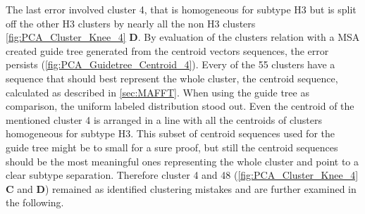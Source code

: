 The last error involved cluster 4, that is homogeneous for subtype H3 but is split off the other H3 clusters by nearly all the non H3 clusters \autoref{fig:PCA_Cluster_Knee_4} \textbf{\textsf{D}}. By evaluation of the clusters relation with a \gls{MSA} created guide tree generated from the centroid vectors sequences, the error persists (\autoref{fig:PCA_Guidetree_Centroid_4}). Every of the 55 clusters have a sequence that should best represent the whole cluster, the centroid sequence, calculated as described in \autoref{sec:MAFFT}. When using the guide tree as comparison, the uniform labeled distribution stood out. Even the centroid of the mentioned cluster 4 is arranged in a line with all the centroids of clusters homogeneous for subtype H3. This subset of centroid sequences used for the guide tree might be to small for a sure proof, but still the centroid sequences should be the most meaningful ones representing the whole cluster and point to a clear subtype separation. Therefore cluster 4 and 48 (\autoref{fig:PCA_Cluster_Knee_4} \textbf{\textsf{C}} and \textbf{\textsf{D}}) remained as identified clustering mistakes and are further examined in the following.

